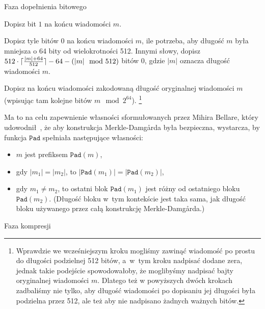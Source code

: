 \documentclass[12pt,a4paper,twoside]{article}
\begin{document}
\begin{myenumerate}

    \item Faza dopełnienia bitowego

    \begin{myenumerate}

        \item Dopisz bit $1$ na końcu wiadomości $m$.

        \item Dopisz tyle bitów $0$ na końcu wiadomości $m$, ile potrzeba, aby
        długość $m$ była mniejsza o 64 bity od wielokrotności 512. Innymi
        słowy, dopisz $512 \cdot \lceil\frac{|m|+64}{512}\rceil-64-(|m| \mod{512})$
        bitów $0$, gdzie $|m|$ oznacza długość wiadomości $m$.

\pagebreak
        \item Dopisz na końcu wiadomości zakodowaną długość oryginalnej
        wiadomości $m$ (wpisując tam kolejne bitów $m \mod{2^{64}}$).
        \footnote{Wprawdzie we wcześniejszym kroku mogliśmy zawinąć wiadomość
        po prostu do długości podzielnej 512 bitów, a~w~tym kroku nadpisać
        dodane zera, jednak takie podejście spowodowałoby, że moglibyśmy
        nadpisać bajty oryginalnej wiadomości $m$. Dlatego też w powyższych
        dwóch krokach zadbaliśmy nie tylko, aby długość wiadomości po dopisaniu
        jej długości była podzielna przez 512, ale też aby nie nadpisano
        żadnych ważnych bitów.}

        Ma to na celu zapewnienie własności sformułowanych przez Mihira
        Bellare, który udowodnił~\cite{merkle_damgard_strengthening}, że aby
        konstrukcja Merkle-Damg\r{a}rda była bezpieczna, wystarcza, by funkcja
        $\mathtt{Pad}$ spełniała następujące własności:

        \begin{itemize}

            \item $m$ jest prefiksem $\mathtt{Pad}(m)$,

            \item gdy $|m_1| = |m_2|$, to $|\mathtt{Pad}(m_1)| =
            |\mathtt{Pad}(m_2)|$,

            \item gdy $m_1 \neq m_2$, to ostatni blok $\mathtt{Pad}(m_1)$ jest
            różny od ostatniego bloku $\mathtt{Pad}(m_2)$. (Długość bloku
            w~tym kontekście jest taka sama, jak długość bloku używanego przez
            całą konstrukcję Merkle-Damg\r{a}rda.)

        \end{itemize}

    \end{myenumerate}

    \item Faza kompresji

\end{myenumerate}
\end{document}
